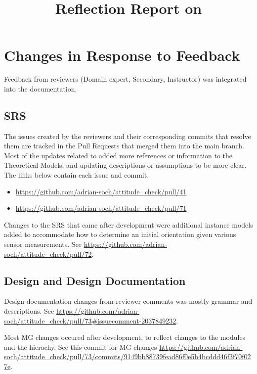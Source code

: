 \documentclass{article}
\title{Reflection Report on \progname}
\author{\authname}
\date{}
\begin{document}
\maketitle

\section{Changes in Response to Feedback}

Feedback from reviewers (Domain expert, Secondary, Instructor) was integrated into the
documentation.


\subsection{SRS}

The issues created by the reviewers and their corresponding commits that resolve them are tracked in
the Pull Requests that merged them into the main branch. Most of the updates related to added more
references or information to the Theoretical Models, and updating descriptions or assumptions to be
more clear. The links below contain each issue and commit.

\begin{itemize}
    \item \url{https://github.com/adrian-soch/attitude_check/pull/41}
    \item \url{https://github.com/adrian-soch/attitude_check/pull/71}
\end{itemize}

Changes to the SRS that came after development were additional instance models added to accommodate
how to determine an initial orientation given various sensor measurements. See
\url{https://github.com/adrian-soch/attitude_check/pull/72}.

\subsection{Design and Design Documentation}

Design documentation changes from reviewer comments was mostly grammar and descriptions. See
\url{https://github.com/adrian-soch/attitude_check/pull/73#issuecomment-2037849232}.

Most MG changes occured after development, to reflect changes to the modules and the hierachy. See
this commit for MG changes
\url{https://github.com/adrian-soch/attitude_check/pull/73/commits/9149bb88739fead86f0e5b4bcddd46f3f70f027e}.
\end{document}
